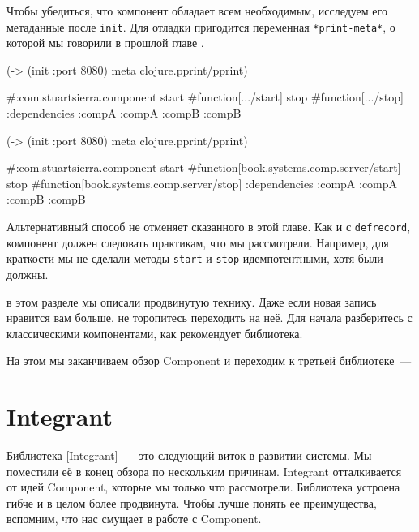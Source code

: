 \fi

Чтобы убедиться, что компонент обладает всем необходимым, исследуем его
метаданные после \verb|init|. Для отладки пригодится переменная
\verb|*print-meta*|, о которой мы говорили в прошлой главе .

\ifnarrow

\begin{english}
  \begin{clojure}
(-> (init {:port 8080})
    meta
    clojure.pprint/pprint)

#:com.stuartsierra.component
 {start #function[.../start]
  stop  #function[.../stop]
  :dependencies
  {:compA :compA :compB :compB}}
  \end{clojure}
\end{english}

\else

\begin{english}
  \begin{clojure}
(-> (init {:port 8080})
    meta
    clojure.pprint/pprint)

#:com.stuartsierra.component
  {start #function[book.systems.comp.server/start]
   stop #function[book.systems.comp.server/stop]
   :dependencies {:compA :compA :compB :compB}}
  \end{clojure}
\end{english}

\fi


Альтернативный способ не отменяет сказанного в этой главе. Как и с
\verb|defrecord|, компонент должен следовать практикам, что мы
рассмотрели. Например, для краткости мы не сделали методы \verb|start| и
\verb|stop| идемпотентными, хотя были должны.

в этом разделе мы описали продвинутую технику. Даже если новая запись нравится
вам больше, не торопитесь переходить на неё. Для начала разберитесь с
классическими компонентами, как рекомендует библиотека.

На этом мы заканчиваем обзор Component и переходим к третьей библиотеке~---

\section{Integrant}


Библиотека [Integrant]~--- это
следующий виток в развитии системы. Мы поместили её в конец обзора по нескольким
причинам. Integrant отталкивается от идей Component, которые мы только что
рассмотрели. Библиотека устроена гибче и в целом более продвинута. Чтобы лучше
понять ее преимущества, вспомним, что нас смущает в работе с Component.

